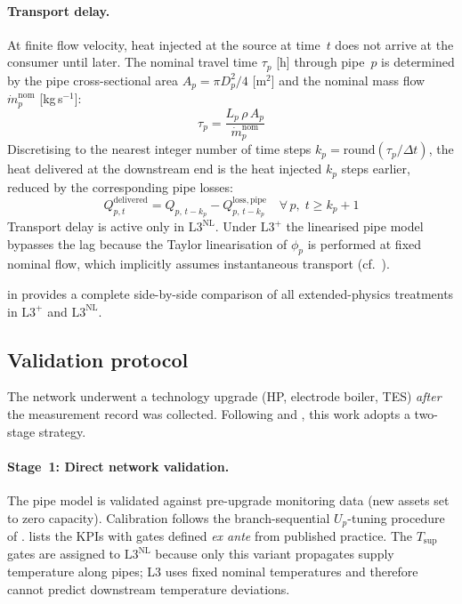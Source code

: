 \documentclass[a4paper,fleqn]{cas-dc}
\newcommand{\Lplus}{\mathrm{L3}^{+}}
\newcommand{\Lnl}{\mathrm{L3}^{\mathrm{NL}}}
\begin{document}
\paragraph{Transport delay.}
\label{sec:model_delay}
At finite flow velocity, heat injected at the source at time~$t$
does not arrive at the consumer until later. The nominal
travel time $\tau_p$ [h] through pipe~$p$ is determined by the
pipe cross-sectional area $A_p = \pi D_p^2/4$ [m$^2$] and
the nominal mass flow $\dot{m}_p^{\mathrm{nom}}$ [kg\,s$^{-1}$]:
%
\begin{equation}
  \tau_p = \frac{L_p\, \rho\, A_p}{\dot{m}_p^{\mathrm{nom}}}
  \label{eq:delay_time}
\end{equation}
%
Discretising to the nearest integer number of time steps
$k_p = \mathrm{round}(\tau_p / \Delta t)$, the heat delivered
at the downstream end is the heat injected $k_p$ steps earlier,
reduced by the corresponding pipe losses:
%
\begin{equation}
  Q_{p,t}^{\mathrm{delivered}} =
    Q_{p,\,t-k_p} - Q_{p,\,t-k_p}^{\mathrm{loss,pipe}}
  \quad \forall\, p,\; t \geq k_p{+}1
  \label{eq:delayed_balance}
\end{equation}
%
Transport delay is active only in $\Lnl$. Under $\Lplus$ the
linearised pipe model bypasses the lag because the Taylor
linearisation of $\phi_p$ is performed at fixed nominal flow,
which implicitly assumes instantaneous transport
(cf.\ ).

 in 
provides a complete side-by-side comparison of all extended-physics
treatments in $\Lplus$ and $\Lnl$.

\subsection{Validation protocol}
\label{sec:val_protocol}

The network underwent a technology upgrade (HP, electrode boiler,
TES) \emph{after} the measurement record was collected. Following
\citet{Kus2025} and \citet{Maldonado2024}, this work adopts a two-stage
strategy.

\paragraph{Stage~1: Direct network validation.}
The pipe model is validated against pre-upgrade monitoring data
(new assets set to zero capacity). Calibration follows the
branch-sequential $U_p$-tuning procedure of
\citet{Maldonado2024}.  lists the KPIs with
gates defined \emph{ex ante} from published practice. The
$T_{\mathrm{sup}}$ gates are assigned to $\Lnl$ because only this
variant propagates supply temperature along pipes; L3 uses fixed
nominal temperatures and therefore cannot predict downstream
temperature deviations.
\end{document}
